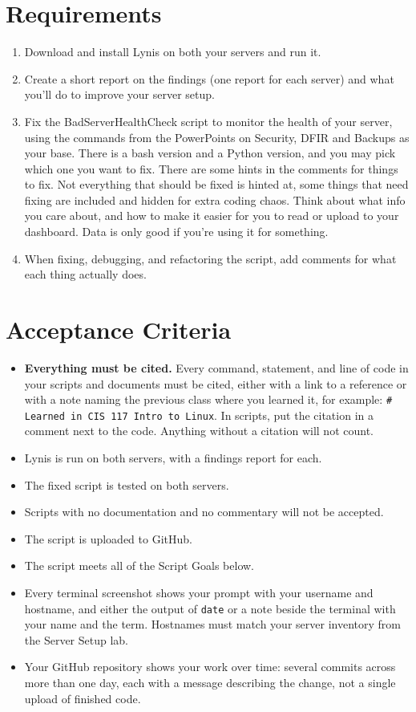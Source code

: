 \documentclass[12pt]{article}
\begin{document}
\section*{Requirements}
\begin{enumerate}
    \item Download and install Lynis on both your servers and run it.
    \item Create a short report on the findings (one report for each server) and what you'll do to improve your server setup.
    \item Fix the BadServerHealthCheck script to monitor the health of your server, using the commands from the PowerPoints on Security, DFIR and Backups as your base. There is a bash version and a Python version, and you may pick which one you want to fix. There are some hints in the comments for things to fix. Not everything that should be fixed is hinted at, some things that need fixing are included and hidden for extra coding chaos. Think about what info you care about, and how to make it easier for you to read or upload to your dashboard.  Data is only good if you're using it for something.
    \item When fixing, debugging, and refactoring the script, add comments for what each thing actually does.
\end{enumerate}

\section*{Acceptance Criteria}
\begin{itemize}
    \item \textbf{Everything must be cited.} Every command, statement, and line of code in your scripts and documents must be cited, either with a link to a reference or with a note naming the previous class where you learned it, for example: \texttt{\# Learned in CIS 117 Intro to Linux}. In scripts, put the citation in a comment next to the code. Anything without a citation will not count.
    \item Lynis is run on both servers, with a findings report for each.
    \item The fixed script is tested on both servers.
    \item Scripts with no documentation and no commentary will not be accepted.
    \item The script is uploaded to GitHub.
    \item The script meets all of the Script Goals below.
    \item Every terminal screenshot shows your prompt with your username and hostname, and either the output of \texttt{date} or a note beside the terminal with your name and the term. Hostnames must match your server inventory from the Server Setup lab.
    \item Your GitHub repository shows your work over time: several commits across more than one day, each with a message describing the change, not a single upload of finished code.
\end{itemize}
\end{document}
